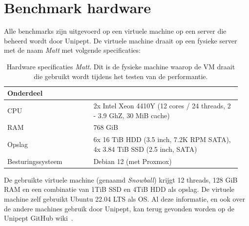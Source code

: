 \documentclass[11pt,dutch,faculty=we,layout=titlefont,underline=false,titleUppercase=true,titleUnderline=true]{ugent2016-report}
\begin{document}
    \section{Benchmark hardware}\label{sec:benchmark-hardware}
    Alle benchmarks zijn uitgevoerd op een virtuele machine op een server die beheerd wordt door Unipept.
    De virtuele machine draait op een fysieke server met de naam \textit{Matt} met volgende specificaties:

    \begin{table}[h!]
        \centering
        \begin{tabular}{p{0.35\linewidth} p{0.6\linewidth}}
            Onderdeel         &                                                                           \\
            \hline\hline
            CPU               & 2x Intel Xeon 4410Y (12 cores / 24 threads, 2 - 3.9 GhZ, 30 MiB cache)    \\
            RAM               & 768 GiB                                                                   \\
            Opslag            & 6x 16 TiB HDD (3.5 inch, 7.2K RPM SATA), 4x 3.84 TiB SSD (2.5 inch, SATA) \\
            Besturingssysteem & Debian 12 (met Proxmox)                                                   \\
            \hline
        \end{tabular}
        \caption{Hardware specificaties \textit{Matt}. Dit is de fysieke machine waarop de VM draait die gebruikt wordt tijdens het testen van de performantie.}
        \label{tab:Matt_hardware}
    \end{table}

    De gebruikte virtuele machine (genaamd \textit{Snowball}) krijgt 12 threads, 128 GiB RAM en een combinatie van 1TiB SSD en 4TiB HDD als opslag.
    De virtuele machine zelf gebruikt Ubuntu 22.04 LTS als OS\@.
    Al deze informatie, en ook over de andere machines gebruik door Unipept, kan terug gevonden worden op de Unipept GitHub wiki~\cite{unipept_infrastructure}.

    


    \printbibliography[heading=bibintoc,title={Referenties}] %


    \appendix
    
\end{document}
